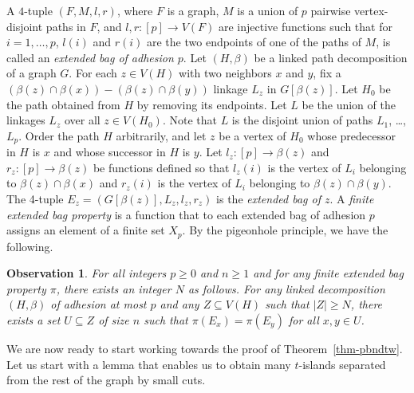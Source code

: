 \documentclass[12pt]{article}
\newtheorem{observation}[theorem]{Observation}
\begin{document}
A $4$-tuple $(F,M,l,r)$, where $F$ is a graph, $M$ is a union of $p$ pairwise vertex-disjoint paths in $F$, and $l,r:[p]\to V(F)$ are injective functions such that for $i=1,\ldots,p$,
$l(i)$ and $r(i)$ are the two endpoints of one of the paths of $M$, is called an \emph{extended bag of adhesion $p$}.
Let $(H,\beta)$ be a linked path decomposition of a graph $G$.  For each $z\in V(H)$ with two neighbors $x$ and $y$, fix a $(\beta(z)\cap\beta(x))-(\beta(z)\cap\beta(y))$ linkage $L_z$
in $G[\beta(z)]$.  Let $H_0$ be the path obtained from $H$ by removing its endpoints.
Let $L$ be the union of the linkages $L_z$ over all $z\in V(H_0)$.  Note that $L$ is the disjoint union of paths $L_1$, \ldots, $L_p$.
Order the path $H$ arbitrarily, and let $z$ be a vertex of $H_0$ whose predecessor in $H$ is $x$ and whose successor in $H$ is $y$.
Let $l_z:[p]\to\beta(z)$ and $r_z:[p]\to\beta(z)$ be functions defined so that $l_z(i)$ is the vertex of $L_i$ belonging to $\beta(z)\cap\beta(x)$ and $r_z(i)$ is the vertex of $L_i$ belonging to $\beta(z)\cap\beta(y)$.
The 4-tuple $E_z=(G[\beta(z)],L_z,l_z,r_z)$ is the \emph{extended bag of $z$}.  A \emph{finite extended bag property} is a function that to each extended bag of adhesion $p$ assigns an element of a finite set $X_p$.
By the pigeonhole principle, we have the following.

\begin{observation}\label{obs-prop}
For all integers $p\ge 0$ and $n\ge 1$ and for any finite extended bag property $\pi$, there exists an integer $N$ as follows.
For any linked decomposition $(H,\beta)$ of adhesion at most $p$ and any $Z \subseteq V(H)$ such that $|Z| \geq N$, there exists a set $U\subseteq Z$ of size $n$
such that $\pi(E_x)=\pi(E_y)$ for all $x,y\in U$.
\end{observation}

We are now ready to start working towards the proof of Theorem~\ref{thm-pbndtw}.  Let us start with a lemma that enables us to obtain
many $t$-islands separated from the rest of the graph by small cuts.
\end{document}
